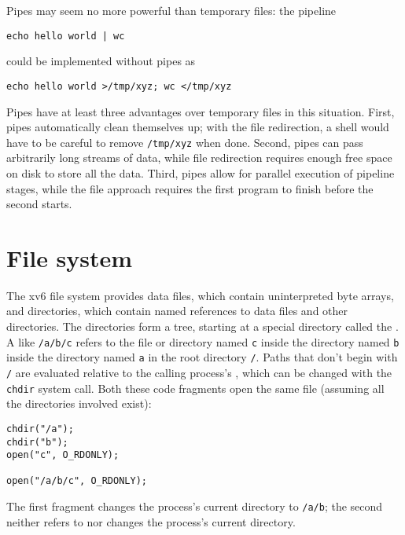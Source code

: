 Pipes may seem no more powerful than temporary files:
the pipeline
\begin{lstlisting}[]
echo hello world | wc
\end{lstlisting}
could be implemented without pipes as
\begin{lstlisting}[]
echo hello world >/tmp/xyz; wc </tmp/xyz
\end{lstlisting}
Pipes have at least three advantages over temporary files
in this situation.
First, pipes automatically clean themselves up;
with the file redirection, a shell would have to
be careful to remove
\lstinline{/tmp/xyz}
when done.
Second, pipes can pass arbitrarily long streams of
data, while file redirection requires enough free space
on disk to store all the data.
Third, pipes allow for parallel execution of pipeline stages,
while the file approach requires the first program to finish
before the second starts.
\section{File system}

The xv6 file system provides data files,
which contain uninterpreted byte arrays,
and directories, which
contain named references to data files and other directories.
The directories form a tree, starting
at a special directory called the
.
A
like
\lstinline{/a/b/c}
refers to the file or directory named
\lstinline{c}
inside the directory named
\lstinline{b}
inside the directory named
\lstinline{a}
in the root directory
\lstinline{/}.
Paths that don't begin with
\lstinline{/}
are evaluated relative to the calling process's
,
which can be changed with the
\lstinline{chdir}
system call.
Both these code fragments open the same file
(assuming all the directories involved exist):
\begin{lstlisting}[]
chdir("/a");
chdir("b");
open("c", O_RDONLY);

open("/a/b/c", O_RDONLY);
\end{lstlisting}
The first fragment changes the process's current directory to
\lstinline{/a/b};
the second neither refers to nor changes the process's current directory.

